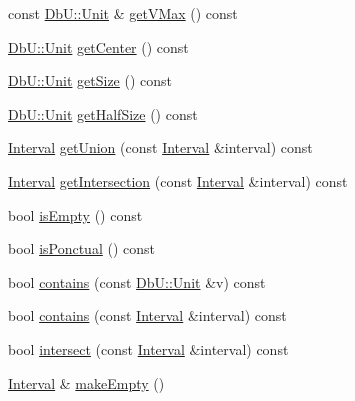 \begin{DoxyCompactItemize}
\item 
const \hyperlink{group__DbUGroup_ga4fbfa3e8c89347af76c9628ea06c4146}{Db\-U\-::\-Unit} \& \hyperlink{classHurricane_1_1Interval_ae264becc34395a6f5e92342ab0b0d5e4}{get\-V\-Max} () const 
\item 
\hyperlink{group__DbUGroup_ga4fbfa3e8c89347af76c9628ea06c4146}{Db\-U\-::\-Unit} \hyperlink{classHurricane_1_1Interval_a103912f77a152051c8f0d660ea844093}{get\-Center} () const 
\item 
\hyperlink{group__DbUGroup_ga4fbfa3e8c89347af76c9628ea06c4146}{Db\-U\-::\-Unit} \hyperlink{classHurricane_1_1Interval_af6de3f1583e84c801319280e392ab855}{get\-Size} () const 
\item 
\hyperlink{group__DbUGroup_ga4fbfa3e8c89347af76c9628ea06c4146}{Db\-U\-::\-Unit} \hyperlink{classHurricane_1_1Interval_aa8ac6ae23f4f071e5ded5af99c3d095f}{get\-Half\-Size} () const 
\item 
\hyperlink{classHurricane_1_1Interval}{Interval} \hyperlink{classHurricane_1_1Interval_a5ede336239d00d5eab80503ec4fb3f9e}{get\-Union} (const \hyperlink{classHurricane_1_1Interval}{Interval} \&interval) const 
\item 
\hyperlink{classHurricane_1_1Interval}{Interval} \hyperlink{classHurricane_1_1Interval_a0eafc3fd643e6310065eedee14cfe4eb}{get\-Intersection} (const \hyperlink{classHurricane_1_1Interval}{Interval} \&interval) const 
\item 
bool \hyperlink{classHurricane_1_1Interval_a7e68349795ed14d299571e9d1b532594}{is\-Empty} () const 
\item 
bool \hyperlink{classHurricane_1_1Interval_a3483407428e89562b329f29eef28baf7}{is\-Ponctual} () const 
\item 
bool \hyperlink{classHurricane_1_1Interval_a17c0ad5f01a47885996b413d87f1af4d}{contains} (const \hyperlink{group__DbUGroup_ga4fbfa3e8c89347af76c9628ea06c4146}{Db\-U\-::\-Unit} \&v) const 
\item 
bool \hyperlink{classHurricane_1_1Interval_affc716d5253ea4ee3a6d6aedb219ad10}{contains} (const \hyperlink{classHurricane_1_1Interval}{Interval} \&interval) const 
\item 
bool \hyperlink{classHurricane_1_1Interval_abc953789f0e6cfc58f8564c81c4788bf}{intersect} (const \hyperlink{classHurricane_1_1Interval}{Interval} \&interval) const 
\item 
\hyperlink{classHurricane_1_1Interval}{Interval} \& \hyperlink{classHurricane_1_1Interval_a1e171021dcd5c0dc7e8afb0b2324c5ee}{make\-Empty} ()
\item 

\end{DoxyCompactItemize}
